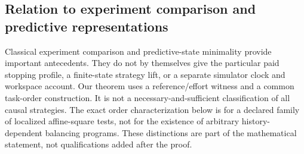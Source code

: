 \subsection*{Relation to experiment comparison and predictive representations}
Classical experiment comparison \cite{Blackwell} and predictive-state minimality \cite{SC} provide important antecedents. They do not by themselves give the particular paid stopping profile, a finite-state strategy lift, or a separate simulator clock and workspace account. Our theorem uses a reference/effort witness and a common task-order construction. It is not a necessary-and-sufficient classification of all causal strategies. The exact order characterization below is for a declared family of localized affine-square tests, not for the existence of arbitrary history-dependent balancing programs. These distinctions are part of the mathematical statement, not qualifications added after the proof.
